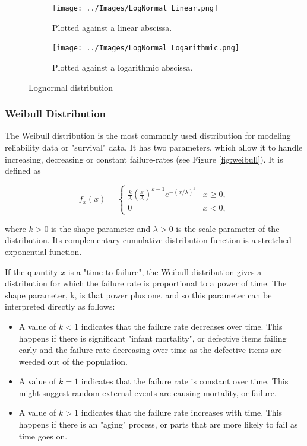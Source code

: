 \begin{figure}
\centering
\begin{subfigure}{.5\textwidth}
  \centering
  \texttt{[image: ../Images/LogNormal\_Linear.png]}
  \caption{Plotted against a linear abscissa.}
  \label{fig:Lognormal_Sub1}
\end{subfigure}%
\begin{subfigure}{.5\textwidth}
  \centering
  \texttt{[image: ../Images/LogNormal\_Logarithmic.png]}
  \caption{Plotted against a logarithmic abscissa.}
  \label{fig:Lognormal_Sub2}
\end{subfigure}
\caption{Lognormal distribution}
\label{fig:lognormal}
\end{figure}

\subsubsection{Weibull Distribution}

The Weibull distribution is the most commonly used distribution for modeling reliability data or "survival" data. It has two parameters, which allow it to handle increasing, decreasing or constant failure-rates (see Figure \ref{fig:weibull}).
It is defined as

\begin{equation}\label{eq:weibull}
f_x (x) =
  \begin{cases}
    \frac{k}{\lambda}\left(\frac{x}{\lambda}\right)^{k-1}e^{-(x/\lambda)^{k}} & x\geq0 ,\\
    0 & x<0 ,
    \end{cases}
\end{equation}

where $k > 0$ is the shape parameter and $\lambda > 0$ is the scale parameter of the distribution. Its complementary cumulative distribution function is a stretched exponential function.

If the quantity $x$ is a "time-to-failure", the Weibull distribution gives a distribution for which the failure rate is proportional to a power of time. The shape parameter, k, is that power plus one, and so this parameter can be interpreted directly as follows:

\begin{itemize}
  \item  A value of $k < 1$ indicates that the failure rate decreases over time. This happens if there is significant "infant mortality", or defective items failing early and the failure rate decreasing over time as the defective items are weeded out of the population.

  \item  A value of $k = 1$ indicates that the failure rate is constant over time. This might suggest random external events are causing mortality, or failure.
  \item  A value of $k > 1$ indicates that the failure rate increases with time. This happens if there is an "aging" process, or parts that are more likely to fail as time goes on.
\end{itemize}

